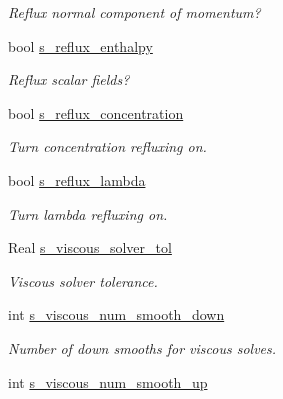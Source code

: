 \begin{DoxyCompactItemize}
\begin{DoxyCompactList}\small\item\em Reflux normal component of momentum? \end{DoxyCompactList}\item 
bool \hyperlink{class_a_m_r_level_mushy_layer_a17f58299941c1b1c2bf58a412d8c91a6}{s\-\_\-reflux\-\_\-enthalpy}
\begin{DoxyCompactList}\small\item\em Reflux scalar fields? \end{DoxyCompactList}\item 
\hypertarget{class_a_m_r_level_mushy_layer_a8afb3180fbc79a686b45976746e08e69}{bool \hyperlink{class_a_m_r_level_mushy_layer_a8afb3180fbc79a686b45976746e08e69}{s\-\_\-reflux\-\_\-concentration}}\label{class_a_m_r_level_mushy_layer_a8afb3180fbc79a686b45976746e08e69}

\begin{DoxyCompactList}\small\item\em Turn concentration refluxing on. \end{DoxyCompactList}\item 
bool \hyperlink{class_a_m_r_level_mushy_layer_ad8271cd4dc0e17cc132a28165ccdbbfc}{s\-\_\-reflux\-\_\-lambda}
\begin{DoxyCompactList}\small\item\em Turn lambda refluxing on. \end{DoxyCompactList}\item 
\hypertarget{class_a_m_r_level_mushy_layer_a57b52432290e5939d6093b0e21088a02}{Real \hyperlink{class_a_m_r_level_mushy_layer_a57b52432290e5939d6093b0e21088a02}{s\-\_\-viscous\-\_\-solver\-\_\-tol}}\label{class_a_m_r_level_mushy_layer_a57b52432290e5939d6093b0e21088a02}

\begin{DoxyCompactList}\small\item\em Viscous solver tolerance. \end{DoxyCompactList}\item 
\hypertarget{class_a_m_r_level_mushy_layer_a6f106e6e68635bc0f9d01c8ee9d07990}{int \hyperlink{class_a_m_r_level_mushy_layer_a6f106e6e68635bc0f9d01c8ee9d07990}{s\-\_\-viscous\-\_\-num\-\_\-smooth\-\_\-down}}\label{class_a_m_r_level_mushy_layer_a6f106e6e68635bc0f9d01c8ee9d07990}

\begin{DoxyCompactList}\small\item\em Number of down smooths for viscous solves. \end{DoxyCompactList}\item 
\hypertarget{class_a_m_r_level_mushy_layer_a05982dd38ce4afe6da1ca2545cca7591}{int \hyperlink{class_a_m_r_level_mushy_layer_a05982dd38ce4afe6da1ca2545cca7591}{s\-\_\-viscous\-\_\-num\-\_\-smooth\-\_\-up}}\label{class_a_m_r_level_mushy_layer_a05982dd38ce4afe6da1ca2545cca7591}


\end{DoxyCompactItemize}
